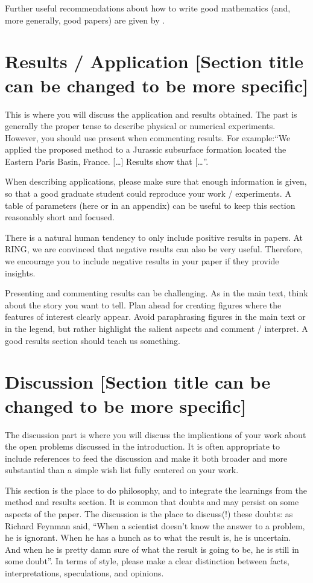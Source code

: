 \documentclass[final]{ring}
\begin{document}
Further useful recommendations about how to write good mathematics (and, more generally, good papers) are given by \citet{Lee2010}.


\section{Results / Application [Section title can be changed to be more specific]}
\label{appli}

This is where you will discuss the application and results obtained. The past is generally the proper tense to describe physical or numerical experiments. However, you should use present when commenting results. For example:``We applied the proposed method to a Jurassic subsurface formation located the Eastern Paris Basin, France. […] Results show that […''.

When describing applications, please make sure that enough information is given, so that a good graduate student could reproduce your work / experiments. A table of parameters (here or in an appendix) can be useful to keep this section reasonably short and focused.

There is a natural human tendency to only include positive results in papers. At RING, we are convinced that negative results can also be very useful. Therefore, we encourage you to include negative results in your paper if they provide insights. 

Presenting and commenting results can be challenging. As in the main text, think about the story you want to tell. Plan ahead for creating figures where the features of interest clearly appear. Avoid paraphrasing figures in the main text or in the legend, but rather highlight the salient aspects and comment / interpret. A good results section should teach us something. 


\section{Discussion [Section title can be changed to be more specific]}
\label{discussion}

The discussion part is where you will discuss the implications of your work about the open problems discussed in the introduction. It is often appropriate to include references to feed the discussion and make it both broader and more substantial than a simple wish list fully centered on your work. 

This section is the place to do philosophy, and to integrate the learnings from the method and results section. It is common that doubts and may persist on some aspects of the paper. The discussion is the place to discuss(!) these doubts: as Richard Feynman said, ``When a scientist doesn't know the answer to a problem, he is ignorant. When he has a hunch as to what the result is, he is uncertain. And when he is pretty damn sure of what the result is going to be, he is still in some doubt''. In terms of style, please make a clear distinction between facts, interpretations, speculations, and opinions. 
\end{document}
